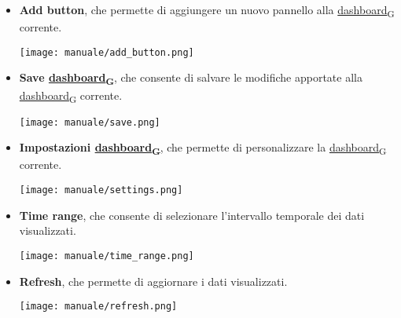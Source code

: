 \begin{itemize}
\begin{center}
        \end{center}
    \item \textbf{Add button}, che permette di aggiungere un nuovo pannello alla \href{https://7last.github.io/docs/pb/documentazione-interna/glossario\#dashboard}{dashboard\textsubscript{G}} corrente.
        \begin{center}
            \texttt{[image: manuale/add\_button.png]}
        \end{center}
    \item \textbf{Save \href{https://7last.github.io/docs/pb/documentazione-interna/glossario\#dashboard}{dashboard\textsubscript{G}}}, che consente di salvare le modifiche apportate alla \href{https://7last.github.io/docs/pb/documentazione-interna/glossario\#dashboard}{dashboard\textsubscript{G}} corrente.
        \begin{center}
            \texttt{[image: manuale/save.png]}
        \end{center}
    \item \textbf{Impostazioni \href{https://7last.github.io/docs/pb/documentazione-interna/glossario\#dashboard}{dashboard\textsubscript{G}}}, che permette di personalizzare la \href{https://7last.github.io/docs/pb/documentazione-interna/glossario\#dashboard}{dashboard\textsubscript{G}} corrente.
        \begin{center}
            \texttt{[image: manuale/settings.png]}
        \end{center}
    \newpage
    \item \textbf{Time range}, che consente di selezionare l'intervallo temporale dei dati visualizzati.
        \begin{center}
            \texttt{[image: manuale/time\_range.png]}
        \end{center}
    \item \textbf{Refresh}, che permette di aggiornare i dati visualizzati.
        \begin{center}
            \texttt{[image: manuale/refresh.png]}
        \end{center}
\end{itemize}
